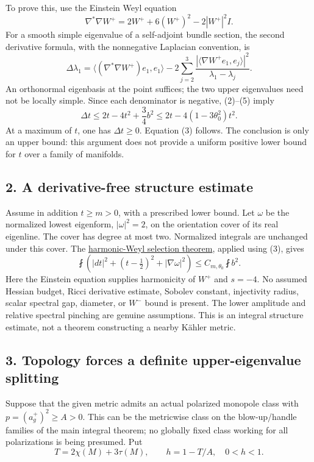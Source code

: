 \documentclass[
  11pt,
]{article}
\begin{document}
To prove this, use the Einstein Weyl equation \[
 \nabla^*\nabla W^+=2W^++6(W^+)^2-2|W^+|^2I.
\tag{4}
\] For a smooth simple eigenvalue of a self-adjoint bundle section, the
second derivative formula, with the nonnegative Laplacian convention, is
\[
 \Delta\lambda_1
 =\langle(\nabla^*\nabla W^+)e_1,e_1\rangle
 -2\sum_{j=2}^3\frac{|\langle\nabla W^+e_1,e_j\rangle|^2}
                          {\lambda_1-\lambda_j}.
\tag{5}
\] An orthonormal eigenbasis at the point suffices; the two upper
eigenvalues need not be locally simple. Since each denominator is
negative, (2)--(5) imply \[
 \Delta t\le 2t-4t^2+\frac34b^2
            \le2t-4(1-3\theta_0^2)t^2.
\tag{6}
\] At a maximum of \(t\), one has \(\Delta t\ge0\). Equation (3)
follows. The conclusion is only an upper bound: this argument does not
provide a uniform positive lower bound for \(t\) over a family of
manifolds.

\hypertarget{a-derivative-free-structure-estimate}{%
\subsection{2. A derivative-free structure
estimate}\label{a-derivative-free-structure-estimate}}

Assume in addition \(t\ge m>0\), with a prescribed lower bound. Let
\(\omega\) be the normalized lowest eigenform, \(|\omega|^2=2\), on the
orientation cover of its real eigenline. The cover has degree at most
two. Normalized integrals are unchanged under this cover. The
\href{line1_signed_harmonic_weyl.md}{harmonic-Weyl selection theorem},
applied using (3), gives \[
 \boxed{\fint\left(|dt|^2+(t-\tfrac12)^2+|\nabla\omega|^2\right)
       \le C_{m,\theta_0}\fint b^2.}
\tag{7}
\] Here the Einstein equation supplies harmonicity of \(W^+\) and
\(s=-4\). No assumed Hessian budget, Ricci derivative estimate, Sobolev
constant, injectivity radius, scalar spectral gap, diameter, or \(W^-\)
bound is present. The lower amplitude and relative spectral pinching are
genuine assumptions. This is an integral structure estimate, not a
theorem constructing a nearby Kähler metric.

\hypertarget{topology-forces-a-definite-upper-eigenvalue-splitting}{%
\subsection{3. Topology forces a definite upper-eigenvalue
splitting}\label{topology-forces-a-definite-upper-eigenvalue-splitting}}

Suppose that the given metric admits an actual polarized monopole class
with \(p=(a_g^+)^2\ge A>0\). This can be the metricwise class on the
blow-up/handle families of the main integral theorem; no globally fixed
class working for all polarizations is being presumed. Put \[
 T=2\chi(M)+3\tau(M),\qquad h=1-T/A,
 \quad 0<h<1.
\tag{8}
\]
\end{document}
